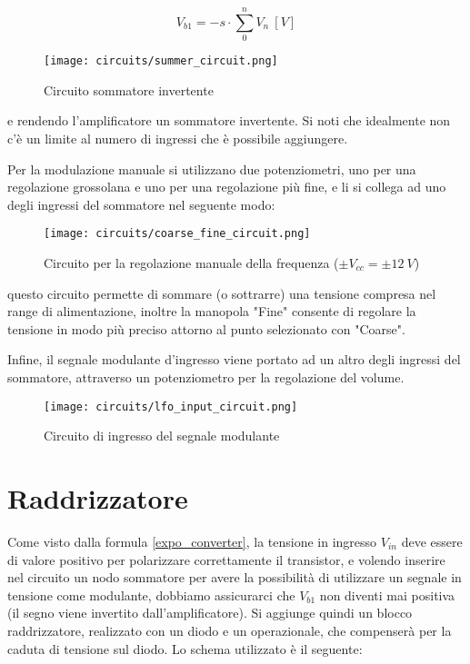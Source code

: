 \begin{equation}
    V_{b1}=-s\cdot\sum_0^n{V_{n}}\ [V]
\end{equation}

\begin{figure}[H]
    \centering
    \texttt{[image: circuits/summer\_circuit.png]}
    \caption{Circuito sommatore invertente}
    \label{summer_circuit}
\end{figure}

e rendendo l'amplificatore un sommatore invertente. Si noti che idealmente non c'è un limite
al numero di ingressi che è possibile aggiungere.

Per la modulazione manuale si utilizzano due potenziometri, uno per una regolazione grossolana
e uno per una regolazione più fine, e li si collega ad uno degli ingressi del sommatore nel
seguente modo:

\begin{figure}[H]
    \centering
    \texttt{[image: circuits/coarse\_fine\_circuit.png]}
    \caption{Circuito per la regolazione manuale della frequenza ($\pm V_{cc}=\pm12\ V$)}
    \label{coarse_fine_circuit}
\end{figure}

questo circuito permette di sommare (o sottrarre) una tensione compresa nel range di
alimentazione, inoltre la manopola "Fine" consente di regolare la tensione in modo più
preciso attorno al punto selezionato con "Coarse".

Infine, il segnale modulante d'ingresso viene portato ad un altro degli ingressi del sommatore,
attraverso un potenziometro per la regolazione del volume.

\begin{figure}[H]
    \centering
    \texttt{[image: circuits/lfo\_input\_circuit.png]}
    \caption{Circuito di ingresso del segnale modulante}
    \label{lfo_input_circuit}
\end{figure}


\section{Raddrizzatore}


Come visto dalla formula \ref{expo_converter}, la tensione in ingresso $V_{in}$ deve essere di
valore positivo per polarizzare correttamente il transistor, e volendo inserire nel circuito
un nodo sommatore per avere la possibilità di utilizzare un segnale in tensione come modulante,
dobbiamo assicurarci che $V_{b1}$ non diventi mai positiva (il segno viene invertito
dall'amplificatore). Si aggiunge quindi un blocco raddrizzatore, realizzato con un diodo e
un operazionale, che compenserà per la caduta di tensione sul diodo. Lo schema utilizzato
è il seguente:

